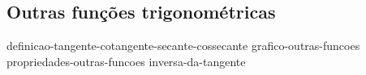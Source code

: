 \subsection{Outras funções trigonométricas}

{definicao-tangente-cotangente-secante-cossecante}
{grafico-outras-funcoes}
{propriedades-outras-funcoes}
{inversa-da-tangente}